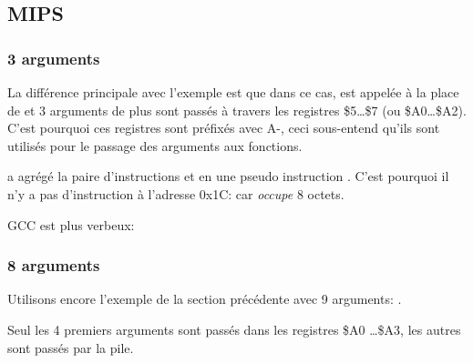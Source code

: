 \subsection{MIPS}

\subsubsection{3 arguments}


La différence principale avec l'exemple \q{\HelloWorldSectionName} est que dans ce cas, \printf est appelée
à la place de \puts et 3 arguments de plus sont passés à travers les registres \$5\dots \$7 (ou \$A0\dots \$A2).
C'est pourquoi ces registres sont préfixés avec A-, ceci sous-entend qu'ils
sont utilisés pour le passage des arguments aux fonctions.





\IDA a agrégé la paire d'instructions  et  en une pseudo instruction .
C'est pourquoi il n'y a pas d'instruction à l'adresse 0x1C: car  \emph{occupe} 8 octets.


GCC \NonOptimizing est plus verbeux:





\subsubsection{8 arguments}

Utilisons encore l'exemple de la section précédente avec 9 arguments: .




Seul les 4 premiers arguments sont passés dans les registres \$A0 \dots \$A3,
les autres sont passés par la pile.

